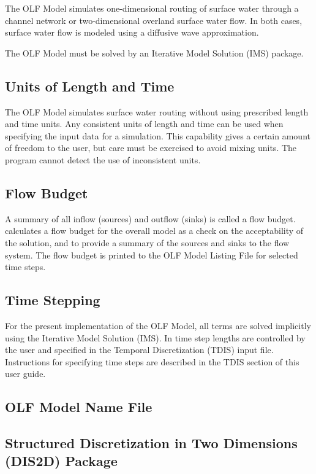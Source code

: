 The OLF Model simulates one-dimensional routing of surface water through a channel network or two-dimensional overland surface water flow.  In both cases, surface water flow is modeled using a diffusive wave approximation.

The OLF Model must be solved by an Iterative Model Solution (IMS) package.

\subsection{Units of Length and Time}
The OLF Model simulates surface water routing without using prescribed length and time units. Any consistent units of length and time can be used when specifying the input data for a simulation. This capability gives a certain amount of freedom to the user, but care must be exercised to avoid mixing units.  The program cannot detect the use of inconsistent units.

\subsection{Flow Budget}
A summary of all inflow (sources) and outflow (sinks) is called a flow budget.  \mf calculates a flow budget for the overall model as a check on the acceptability of the solution, and to provide a summary of the sources and sinks to the flow system.  The flow budget is printed to the OLF Model Listing File for selected time steps.

\subsection{Time Stepping}

For the present implementation of the OLF Model, all terms are solved implicitly using the Iterative Model Solution (IMS).  In \mf time step lengths are controlled by the user and specified in the Temporal Discretization (TDIS) input file.  Instructions for specifying time steps are described in the TDIS section of this user guide.  

\newpage
\subsection{OLF Model Name File}


\newpage
\subsection{Structured Discretization in Two Dimensions (DIS2D) Package}


